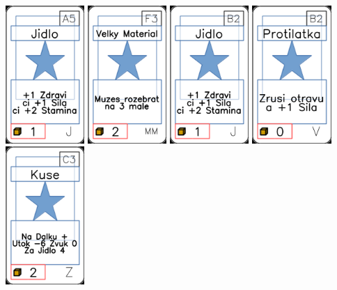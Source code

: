 \documentclass[a4paper]{article}
\begin{document}
	\includegraphics[width=3.0cm]{img-1_4}
	\includegraphics[width=3.0cm]{img-1_57}
	\includegraphics[width=3.0cm]{img-1_6}
	\includegraphics[width=3.0cm]{img-1_66}
	\includegraphics[width=3.0cm]{img-1_102}
\end{document}
